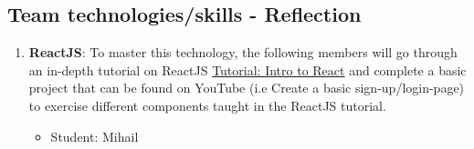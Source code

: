 \documentclass{article}
\begin{document}
\subsection{Team technologies/skills - Reflection  }
\begin{enumerate}
    \item \textbf{ReactJS}: To master this technology, the following members will go through an in-depth tutorial on ReactJS \href{https://reactjs.org/tutorial/tutorial.html}{Tutorial: Intro to React} and complete a basic project that can be found on YouTube (i.e Create a basic sign-up/login-page) to exercise different components taught in the ReactJS tutorial.
        \begin{itemize}
            \item Student: Mihail
        \end{itemize}
    

\end{enumerate}
\end{document}
